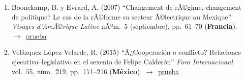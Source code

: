 \documentclass[12 pt, letter]{article}
\newenvironment{CitasMiTrabajo}{
    \begin{footnotesize}
    \begin{enumerate}[label={\footnotesize\emph{cita~\arabic*}},ref=\arabic*] %
        \setlength{\itemsep}{.1\itemsep}
        \setlength{\parskip}{.1\parskip}
    }{\end{enumerate}\end{footnotesize}}
\begin{document}
        \begin{CitasMiTrabajo}

        \item Boonekamp, B. y Evrard, A. (2007)
        ``Changement de rÃ©gime, changement de politique? Le cas de la rÃ©forme su secteur Ã©lectrique au Mexique'' \emph{Visages d'AmÃ©rique Latine} nÃºm.~5 (septiembre), pp.~61--70 (\textbf{Francia}). $\rightarrow$~\href{http://ericmagar.com/cv/cites/magarRomeroFAE/beatrix.pdf}{prueba}

        \item Vel\'azquez L\'opez Velarde, R. (2015)
        ``Â¿Cooperaci\'on o conflicto? Relaciones ejecutivo--legislativo en el sexenio de Felipe Calder\'on'' \emph{Foro Internacional} vol.~55, n\'um.~219, pp.~171--216 (\textbf{M\'exico}). $\rightarrow$~\href{http://ericmagar.com/cv/cites/magarRomeroFAE/vellovel2015.pdf}{prueba}



        \label{ncites:magar.romero.fae.2007} %

        \end{CitasMiTrabajo}




\end{document}
